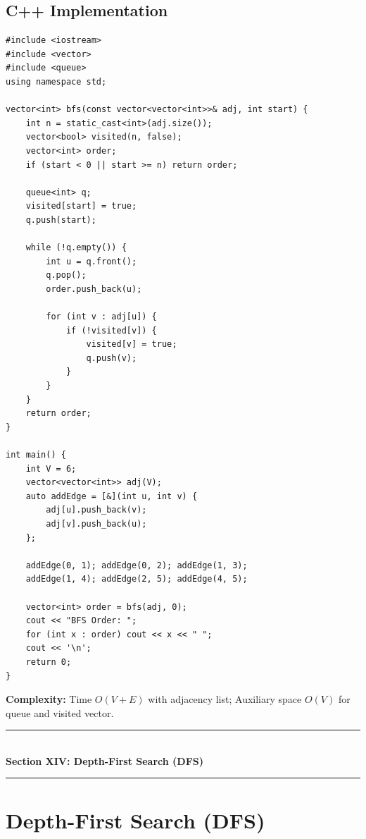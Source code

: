 \subsection{C++ Implementation}

\begin{lstlisting}[style=cppstyle, caption={C++ Breadth-First Search Implementation.}]
#include <iostream>
#include <vector>
#include <queue>
using namespace std;

vector<int> bfs(const vector<vector<int>>& adj, int start) {
    int n = static_cast<int>(adj.size());
    vector<bool> visited(n, false);
    vector<int> order;
    if (start < 0 || start >= n) return order;

    queue<int> q;
    visited[start] = true;
    q.push(start);

    while (!q.empty()) {
        int u = q.front();
        q.pop();
        order.push_back(u);

        for (int v : adj[u]) {
            if (!visited[v]) {
                visited[v] = true;
                q.push(v);
            }
        }
    }
    return order;
}

int main() {
    int V = 6;
    vector<vector<int>> adj(V);
    auto addEdge = [&](int u, int v) {
        adj[u].push_back(v);
        adj[v].push_back(u);
    };

    addEdge(0, 1); addEdge(0, 2); addEdge(1, 3);
    addEdge(1, 4); addEdge(2, 5); addEdge(4, 5);

    vector<int> order = bfs(adj, 0);
    cout << "BFS Order: ";
    for (int x : order) cout << x << " ";
    cout << '\n';
    return 0;
}
\end{lstlisting}

\textbf{Complexity:} Time $\boxed{O(V + E)}$ with adjacency list; Auxiliary space $\boxed{O(V)}$ for queue and visited vector.

\newpage
\begin{center}
\vspace{0.5em}
{\color{primary}\rule{0.45\textwidth}{1.2pt}}\\[4pt]
{\Large\bfseries\color{primary} Section XIV: Depth-First Search (DFS)}\\[2pt]
{\color{primary}\rule{0.45\textwidth}{1.2pt}}
\vspace{0.5em}
\end{center}

\section{Depth-First Search (DFS)}

